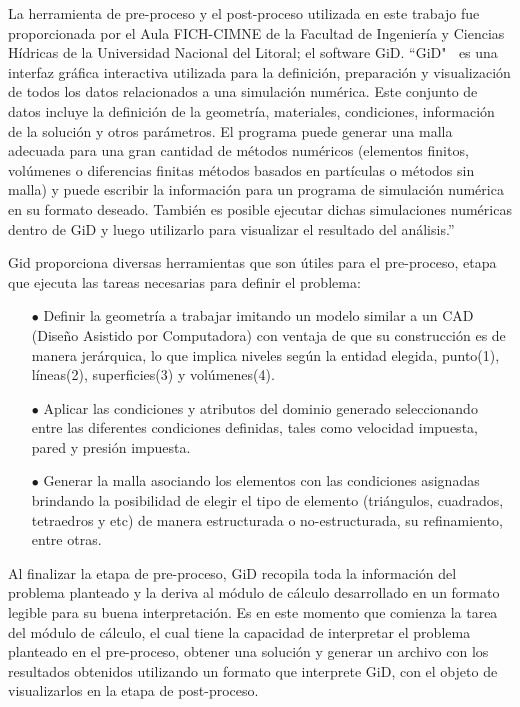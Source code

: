 \documentclass[a4paper,10pt, oneside]{book}
\begin{document}
La herramienta de pre-proceso y el post-proceso utilizada en este trabajo fue proporcionada por el Aula FICH-CIMNE de la Facultad de Ingeniería y Ciencias Hídricas de la Universidad Nacional del Litoral; el software GiD. ``GiD" $~$ es una interfaz gráfica interactiva utilizada para la definición, preparación y visualización de todos los datos relacionados a una simulación numérica. Este conjunto de datos incluye la definición de la geometría, materiales, condiciones, información de la solución y otros parámetros. El programa puede generar una malla adecuada para una gran cantidad de métodos numéricos (elementos finitos, volúmenes o diferencias finitas métodos basados en partículas o métodos sin malla) y puede escribir la información para un programa de simulación numérica en su formato deseado. También es posible ejecutar dichas simulaciones numéricas dentro de GiD y luego utilizarlo para visualizar el resultado del análisis.” \cite{GiD}

Gid proporciona diversas herramientas que son útiles para el pre-proceso, etapa que ejecuta las tareas necesarias para definir el problema:
\begin{itemize}
  \item[$\bullet$] Definir la geometría a trabajar imitando un modelo similar a un CAD (Diseño Asistido por Computadora) con ventaja de que su construcción es de manera jerárquica, lo que implica niveles según la entidad elegida, punto(1), líneas(2), superficies(3) y volúmenes(4).
  \item[$\bullet$] Aplicar las condiciones y atributos del dominio generado seleccionando entre las diferentes condiciones definidas, tales como velocidad impuesta, pared y presión impuesta.
  \item[$\bullet$] Generar la malla asociando los elementos con las condiciones asignadas brindando la posibilidad de elegir el tipo de elemento (triángulos, cuadrados, tetraedros y etc) de manera estructurada o no-estructurada, su refinamiento, entre otras.
\end{itemize}

Al finalizar la etapa de pre-proceso, GiD recopila toda la información del problema planteado y la deriva al módulo de cálculo desarrollado en un formato legible para su buena interpretación. Es en este momento que comienza la tarea del módulo de cálculo, el cual tiene la capacidad de interpretar el problema planteado en el pre-proceso, obtener una solución y generar un archivo con los resultados obtenidos utilizando un formato que interprete GiD, con el objeto de visualizarlos en la etapa de post-proceso.
\end{document}
